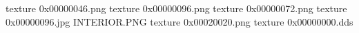 texture 0x00000046.png
texture 0x00000096.png
texture 0x00000072.png
texture 0x00000096.jpg
INTERIOR.PNG
texture 0x00020020.png
texture 0x00000000.dds
